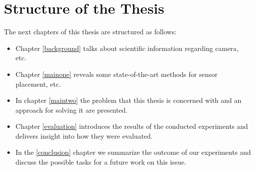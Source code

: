 \section{Structure of the Thesis}



The next chapters of this thesis are structured as follows: 
\begin{itemize}
    \item Chapter \ref{background} talks about scientific information regarding camera, etc.
    \item Chapter \ref{mainone} reveals some state-of-the-art methods for sensor placement, etc.
    \item In chapter \ref{maintwo} the problem that this thesis is concerned with and an approach for solving it are presented.
    \item Chapter \ref{evaluation} introduces the results of the conducted experiments and delivers insight into how they were evaluated.
    \item In the \ref{conclusion} chapter we summarize the outcome of our experiments and discuss the possible tasks for a future work on this issue.
\end{itemize} 
